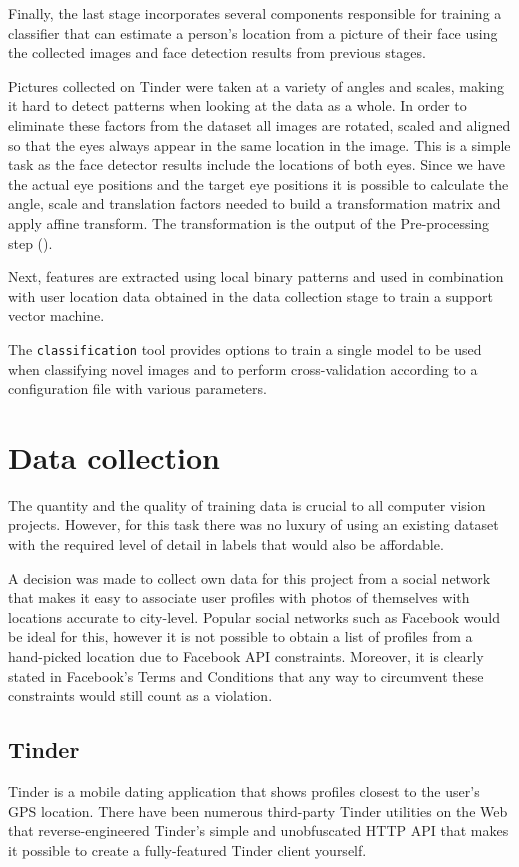 Finally, the last stage incorporates several components responsible for
training a classifier that can estimate a person's location from a picture of
their face using the collected images and face detection results from previous
stages.

Pictures collected on Tinder were taken at a variety of angles and scales,
making it hard to detect patterns when looking at the data as a whole. In order
to eliminate these factors from the dataset all images are rotated, scaled and
aligned so that the eyes always appear in the same location in the image. This
is a simple task as the face detector results include the locations of both
eyes. Since we have the actual eye positions and the target eye positions it is
possible to calculate the angle, scale and translation factors needed to build
a transformation matrix and apply affine transform. The transformation is the
output of the Pre-processing step (). 

Next, features are extracted using local binary patterns and used in
combination with user location data obtained in the data collection stage to
train a support vector machine.

The \texttt{classification} tool provides options to train a single model to be
used when classifying novel images and to perform cross-validation according to
a configuration file with various parameters.


\section{Data collection}
The quantity and the quality of training data is crucial to all computer vision 
projects. However, for this task there was no luxury of using an existing 
dataset with the required level of detail in labels that would also be 
affordable.

A decision was made to collect own data for this project from a social network 
that makes it easy to associate user profiles with photos of themselves with 
locations accurate to city-level. Popular social networks such as Facebook 
would be ideal for this, however it is not possible to obtain a list of 
profiles from a hand-picked location due to Facebook API constraints. 
Moreover, it is clearly stated in Facebook's Terms and Conditions that any way 
to circumvent these constraints would still count as a violation.


\subsection{Tinder}
Tinder is a mobile dating application that shows profiles closest to the 
user's GPS location. There have been numerous third-party Tinder utilities on 
the Web that reverse-engineered Tinder's simple and unobfuscated HTTP API that 
makes it possible to create a fully-featured Tinder client yourself.

